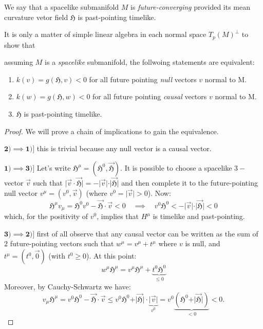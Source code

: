 
\begin{definition}
	We say that a spacelike submanifold \(M\) is \emph{future-converging} provided its mean curvature vetor field \(\mathfrak{H}\) is past-pointing timelike.
\end{definition}



It is only a matter of simple linear algebra in each normal space \(T_p(M)^{\perp}\) to show that
\begin{lemma} \label{lemma:charact-trapped}
	assuming \(M\) is a \emph{spacelike} submanifold, the follwoing statements are equivalent:
	\begin{enumerate}
		\item  \(k(v) =g(\mathfrak{H}, v) < 0 \) for all future pointing \emph{null} vectors \(v\) normal to M.
		\item  \(k(w) =g(\mathfrak{H}, w) < 0 \) for all future pointing \emph{causal} vectors \(v\) normal to M.
		\item \(\mathfrak{H}\) is past-pointing timelike.
	\end{enumerate}
\end{lemma}

\begin{proof}
	We will prove a chain of implications to gain the equivalence.
	
	\(\mathbf{2) \implies 1)]}\) this is trivial because any null vector is a causal vector.
	
	\(\mathbf{1) \implies 3)]}\) Let's write \(\mathfrak{H}^{\mu} = (\mathfrak{H}^0, \vec{\mathfrak{H}})\). It is possible to choose a spacelike \(3-\)vector \(\vec{v}\) such that \(\vert\vec{v}\cdot\vec{\mathfrak{H}}\vert = - \vert\vec{v}\vert\cdot\vert\vec{\mathfrak{H}}\vert\) and  then complete it to the future-pointing null vector \(v^{\mu} = (v^0, \vec{v})\) (where \(v^0 = \vert \vec{v}\vert > 0\)).
	Now:
	\[
	\mathfrak{H}^{\mu}v_{\mu} = \mathfrak{H}^0v^0 - \vec{\mathfrak{H}}\cdot\vec{v} < 0 \quad \implies 
	\quad v^0 \mathfrak{H}^0 < - \vert\vec{v}\vert\cdot\vert\vec{\mathfrak{H}}\vert < 0
	\]
	which, for the positivity of \(v^0\), implies that \(H^{\mu}\) is timelike and past-pointing.
	
	\(\mathbf{3) \implies 2)]}\) first of all observe that any causal vector can be written as the sum of \(2\) future-pointing vectors such that \(w^{\mu}= v^{\mu} + t^{\mu}\) where \(v\) is null, and \(t^{\mu} = (t^0, \vec{0})\) (with \(t^0 \ge 0\)). At this point:
	\[
	w^{\mu}\mathfrak{H}^{\mu} = v^{\mu}\mathfrak{H}^{\mu} + \underbrace{t^0 \mathfrak{H}^0}_{\le0}
	\]
	Moreover, by Cauchy-Schwartz we have:
	\[
	v_{\mu}\mathfrak{H}^{\mu} = v^0 \mathfrak{H}^0 - \vec{\mathfrak{H}}\cdot\vec{v} \le v^0\mathfrak{H}^0 +\vert \vec{\mathfrak{H}}\vert\cdot\underbrace{\vert\vec{v}\vert}_{v^0} = v^0\underbrace{(\mathfrak{H}^0 + \vert \vec{\mathfrak{H}}\vert)}_{<0} < 0.
	\]
\end{proof}

